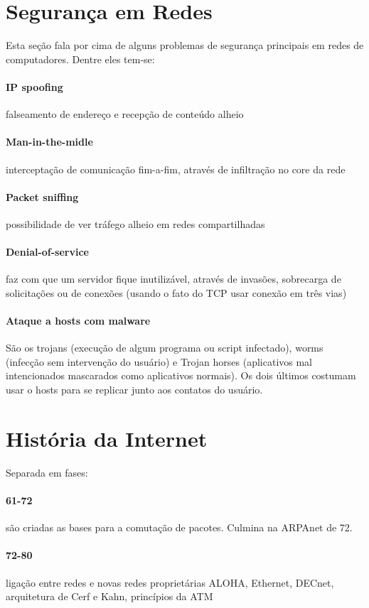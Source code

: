 \section{Segurança em Redes}

Esta seção fala por cima de alguns problemas de segurança principais em redes de computadores.
Dentre eles tem-se: 
\paragraph{IP spoofing} falseamento de endereço e recepção de conteúdo alheio
\paragraph{Man-in-the-midle} interceptação de comunicação fim-a-fim, através de infiltração no core da rede
\paragraph{Packet sniffing} possibilidade de ver tráfego alheio em redes compartilhadas
\paragraph{Denial-of-service} faz com que um servidor fique inutilizável, através de invasões, sobrecarga de solicitações ou de conexões (usando o fato do TCP usar conexão em três vias)
\paragraph{Ataque a hosts com malware} São os trojans (execução de algum programa ou script infectado), worms (infecção sem intervenção do usuário) e Trojan horses (aplicativos mal intencionados mascarados como aplicativos normais). Os dois últimos costumam usar o hosts para se replicar junto aos contatos do usuário.

\section{História da Internet}

Separada em fases:
\paragraph{61-72} são criadas as bases para a comutação de pacotes. Culmina na ARPAnet de 72.
\paragraph{72-80} ligação entre redes e novas redes proprietárias ALOHA, Ethernet, DECnet, arquitetura de Cerf e Kahn, princípios da ATM
